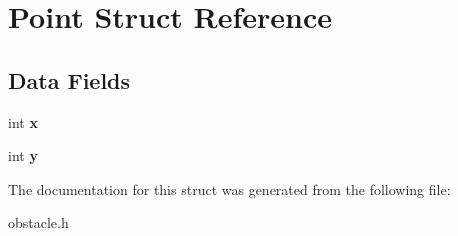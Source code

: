 \hypertarget{struct_point}{}\section{Point Struct Reference}
\label{struct_point}
\subsection*{Data Fields}
\begin{DoxyCompactItemize}
\item 
\hypertarget{struct_point_a6150e0515f7202e2fb518f7206ed97dc}{}int {\bfseries x}\label{struct_point_a6150e0515f7202e2fb518f7206ed97dc}

\item 
\hypertarget{struct_point_a0a2f84ed7838f07779ae24c5a9086d33}{}int {\bfseries y}\label{struct_point_a0a2f84ed7838f07779ae24c5a9086d33}

\end{DoxyCompactItemize}


The documentation for this struct was generated from the following file\+:\begin{DoxyCompactItemize}
\item 
obstacle.\+h\end{DoxyCompactItemize}

